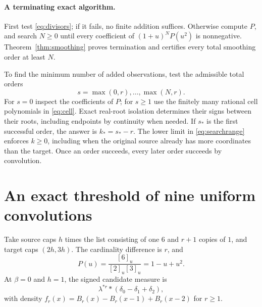 \documentclass[11pt,a4paper]{article}
\theoremstyle{remark}\newtheorem*{ednote}{Editorial note (ProveIt, 2026-10-01)}
\begin{document}
\paragraph{A terminating exact algorithm.}
First test \eqref{eq:divisors}; if it fails, no finite addition suffices. Otherwise compute $P$, and search $N\ge0$ until every coefficient of $(1+u)^NP(u^2)$ is nonnegative. Theorem~\ref{thm:smoothing} proves termination and certifies every total smoothing order at least $N$.

To find the minimum number of added observations, test the admissible total orders
\begin{equation}\label{eq:searchrange}
 s=\max(0,r),\ldots,\max(N,r).
\end{equation}
For $s=0$ inspect the coefficients of $P$; for $s\ge1$ use the finitely many rational cell polynomials in \eqref{eq:cell}. Exact real-root isolation determines their signs between their roots, including endpoints by continuity when needed. If $s_*$ is the first successful order, the answer is $k_*=s_*-r$. The lower limit in \eqref{eq:searchrange} enforces $k\ge0$, including when the original source already has more coordinates than the target. Once an order succeeds, every later order succeeds by convolution.

\section{An exact threshold of nine uniform convolutions}
Take source caps $h$ times the list consisting of one $6$ and $r+1$ copies of $1$, and target caps $(2h,3h)$. The cardinality difference is $r$, and
\[
 P(u)=\frac{[6]_u}{[2]_u[3]_u}=1-u+u^2.
\]
At $\beta=0$ and $h=1$, the signed candidate measure is
\[
 \lambda^{*r}*(\delta_0-\delta_1+\delta_2),
\]
with density $f_r(x)=B_r(x)-B_r(x-1)+B_r(x-2)$ for $r\ge1$.
\end{document}
